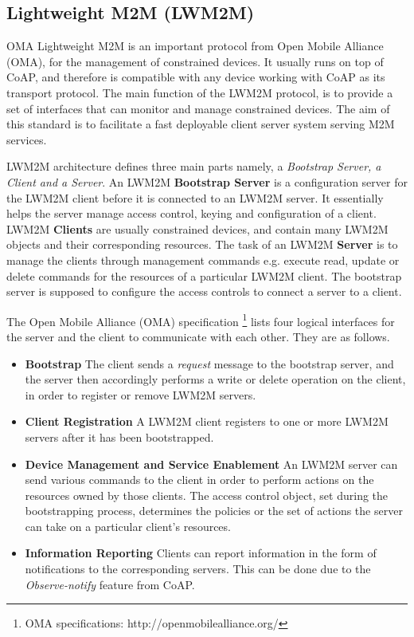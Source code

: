 \documentclass[english]{tktltiki}
\begin{document}
\subsection{Lightweight M2M (LWM2M)}
OMA Lightweight M2M is an important protocol from Open Mobile Alliance (OMA), for the management of constrained devices. It usually runs on top of CoAP, and therefore is compatible with any device working with CoAP as its transport protocol. The main function of the LWM2M protocol, is to provide a set of interfaces that can monitor and manage constrained devices. The aim of this standard is to facilitate a fast deployable client server system serving M2M services. 


LWM2M architecture defines three main parts namely, a \textit{Bootstrap Server, a Client and a Server}. An LWM2M \textbf{Bootstrap Server} is a configuration server for the LWM2M client before it is connected to an LWM2M server. It essentially helps the server manage access control, keying and configuration of a client. LWM2M \textbf{Clients} are usually constrained devices, and contain many LWM2M objects and their corresponding resources. The task of an LWM2M \textbf{Server} is to manage the clients through management commands e.g. execute read, update or delete commands for the resources of a particular LWM2M client. The bootstrap server is supposed to configure the access controls to connect a server to a client. 

The Open Mobile Alliance (OMA) specification \footnote{OMA specifications: http://openmobilealliance.org/} lists four logical interfaces for the server and the client to communicate with each other. They are as follows.

\begin{itemize}
\item \textbf{Bootstrap} The client sends a \textit{request} message to the bootstrap server, and the server then accordingly performs a write or delete operation on the client, in order to register or remove LWM2M servers.
\item \textbf{Client Registration} A LWM2M client registers to one or more LWM2M servers after it has been bootstrapped.
\item \textbf{Device Management and Service Enablement} An LWM2M server can send various commands to the client in order to perform actions on the resources owned by those clients. The access control object, set during the bootstrapping process, determines the policies or the set of actions the server can take on a particular client's resources. 
\item \textbf{Information Reporting} Clients can report information in the form of notifications to the corresponding servers. This can be done due to the \textit{Observe-notify}\cite{observe-notify} feature from CoAP.
\end{itemize}
\end{document}
